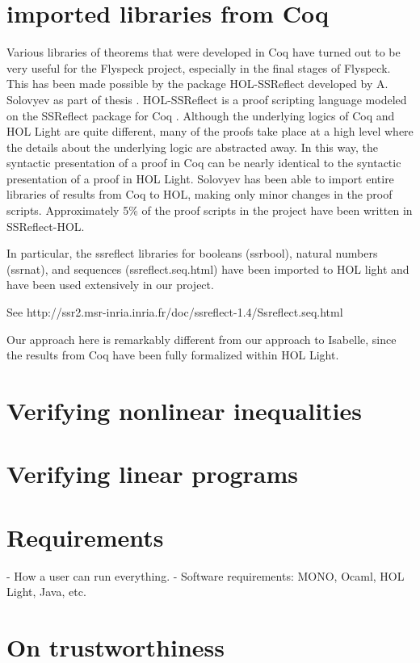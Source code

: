 \section{imported libraries from Coq}

Various libraries of theorems that were developed in Coq have turned out to be very useful for the Flyspeck project, 
especially in the final stages of Flyspeck.  This has been made possible by the package HOL-SSReflect developed by
 A. Solovyev as part of thesis \cite{XX}.  HOL-SSReflect is a proof scripting language modeled on the SSReflect 
package for Coq \cite{XX}.  Although the underlying logics of Coq and HOL Light are quite different, 
many of the proofs take place at a high level where the details about the underlying logic are abstracted away.  
In this way, the syntactic presentation of a proof in Coq can be nearly identical to the syntactic 
presentation of a proof in HOL Light.  Solovyev has been able to import entire libraries of results from 
Coq to HOL, making only minor changes in the proof scripts.  
Approximately 5\% of the proof scripts in the project have been written in SSReflect-HOL.

In particular, the ssreflect libraries for booleans (ssrbool), natural numbers (ssrnat), and sequences (ssreflect.seq.html)
have been imported to HOL light and
have been used extensively in our project.

See http://ssr2.msr-inria.inria.fr/doc/ssreflect-1.4/Ssreflect.seq.html

Our approach here is remarkably different from our approach to Isabelle, since the results from Coq have been fully
formalized within HOL Light. 


\section{Verifying nonlinear inequalities}

\section{Verifying linear programs}

\section{Requirements}

- How a user can run everything.
- Software requirements: MONO, Ocaml, HOL Light, Java, etc.


\section{On trustworthiness}

